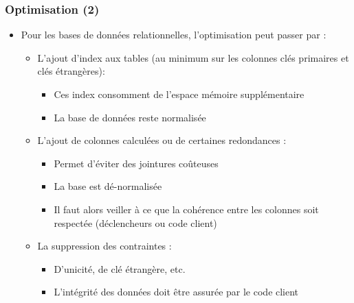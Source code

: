 \begin{frame}
  \frametitle{Optimisation (2)}
  \begin{itemize}
    \item Pour les bases de données relationnelles, l'optimisation peut passer par :
      \begin{itemize}
        \item L'ajout d'index aux tables (au minimum sur les colonnes clés primaires et clés étrangères):
          \begin{itemize}
            \item Ces index consomment de l'espace mémoire supplémentaire
            \item La base de données reste normalisée
          \end{itemize}
        \item L'ajout de colonnes calculées ou de certaines redondances :
          \begin{itemize}
            \item Permet d'éviter des jointures coûteuses
            \item La base est dé-normalisée
            \item Il faut alors veiller à ce que la cohérence entre les colonnes soit respectée (déclencheurs
              ou code client)
          \end{itemize}
        \item La suppression des contraintes :
          \begin{itemize}
            \item D'unicité, de clé étrangère, etc.
            \item L'intégrité des données doit être assurée par le code client
          \end{itemize}
      \end{itemize}
  \end{itemize}
\end{frame}

